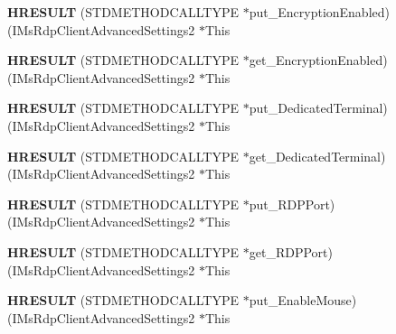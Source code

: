 \begin{DoxyCompactItemize}
{\bfseries H\+R\+E\+S\+U\+LT} (S\+T\+D\+M\+E\+T\+H\+O\+D\+C\+A\+L\+L\+T\+Y\+PE $\ast$put\+\_\+\+Encryption\+Enabled)(I\+Ms\+Rdp\+Client\+Advanced\+Settings2 $\ast$This
\item 
\mbox{\label{struct_i_ms_rdp_client_advanced_settings2_vtbl_acf48db7be64a34c35e027c29a03757f2}} 
{\bfseries H\+R\+E\+S\+U\+LT} (S\+T\+D\+M\+E\+T\+H\+O\+D\+C\+A\+L\+L\+T\+Y\+PE $\ast$get\+\_\+\+Encryption\+Enabled)(I\+Ms\+Rdp\+Client\+Advanced\+Settings2 $\ast$This
\item 
\mbox{\label{struct_i_ms_rdp_client_advanced_settings2_vtbl_ada4b8222371ddf351b7896e8bf7d8fa0}} 
{\bfseries H\+R\+E\+S\+U\+LT} (S\+T\+D\+M\+E\+T\+H\+O\+D\+C\+A\+L\+L\+T\+Y\+PE $\ast$put\+\_\+\+Dedicated\+Terminal)(I\+Ms\+Rdp\+Client\+Advanced\+Settings2 $\ast$This
\item 
\mbox{\label{struct_i_ms_rdp_client_advanced_settings2_vtbl_a0259f4bf22be9ab6017f8adaba579d08}} 
{\bfseries H\+R\+E\+S\+U\+LT} (S\+T\+D\+M\+E\+T\+H\+O\+D\+C\+A\+L\+L\+T\+Y\+PE $\ast$get\+\_\+\+Dedicated\+Terminal)(I\+Ms\+Rdp\+Client\+Advanced\+Settings2 $\ast$This
\item 
\mbox{\label{struct_i_ms_rdp_client_advanced_settings2_vtbl_a40471ac7fd87bfda5c8315178ff4d2cd}} 
{\bfseries H\+R\+E\+S\+U\+LT} (S\+T\+D\+M\+E\+T\+H\+O\+D\+C\+A\+L\+L\+T\+Y\+PE $\ast$put\+\_\+\+R\+D\+P\+Port)(I\+Ms\+Rdp\+Client\+Advanced\+Settings2 $\ast$This
\item 
\mbox{\label{struct_i_ms_rdp_client_advanced_settings2_vtbl_aaeeb1bfb2dce037a987fdd7cd19804e0}} 
{\bfseries H\+R\+E\+S\+U\+LT} (S\+T\+D\+M\+E\+T\+H\+O\+D\+C\+A\+L\+L\+T\+Y\+PE $\ast$get\+\_\+\+R\+D\+P\+Port)(I\+Ms\+Rdp\+Client\+Advanced\+Settings2 $\ast$This
\item 
\mbox{\label{struct_i_ms_rdp_client_advanced_settings2_vtbl_aa0e1dac924b691d903c1f310a83ac948}} 
{\bfseries H\+R\+E\+S\+U\+LT} (S\+T\+D\+M\+E\+T\+H\+O\+D\+C\+A\+L\+L\+T\+Y\+PE $\ast$put\+\_\+\+Enable\+Mouse)(I\+Ms\+Rdp\+Client\+Advanced\+Settings2 $\ast$This
\item 

\end{DoxyCompactItemize}
